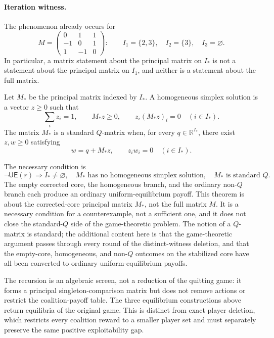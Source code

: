 \documentclass[11pt]{article}
\newcommand{\R}{\mathbb R}
\newcommand{\UE}{\mathsf{UE}}
\begin{document}
\paragraph{Iteration witness.}
The phenomenon already occurs for
\[
 M=\begin{pmatrix}
 0&1&1\\[-1mm]
 -1&0&1\\[-1mm]
 1&-1&0
 \end{pmatrix}:
 \qquad I_1=\{2,3\},\quad I_2=\{3\},\quad I_3=\varnothing.
\]
In particular, a matrix statement about the principal matrix on
$I_*$ is not a statement about the principal matrix on $I_1$, and neither is
a statement about the full matrix.

Let $M_*$ be the principal matrix indexed by $I_*$.  A homogeneous simplex
solution is a vector $z\ge0$ such that
\[
 \sum_i z_i=1,
 \qquad M_*z\ge0,
 \qquad z_i(M_*z)_i=0\quad(i\in I_*).
\]
The matrix $M_*$ is a standard $Q$-matrix when, for every
$q\in\R^{I_*}$, there exist $z,w\ge0$ satisfying
\[
 w=q+M_*z,
 \qquad z_iw_i=0\quad(i\in I_*).
\]

The necessary condition is
\begin{equation}
\label{eq:core-q-gate}
 \boxed{
 \neg\UE(r)\Longrightarrow
 I_*\ne\varnothing,\quad
 M_*\text{ has no homogeneous simplex solution},\quad
 M_*\text{ is standard }Q.}
\end{equation}
The empty corrected core, the homogeneous branch, and the ordinary non-$Q$
branch each produce an ordinary uniform-equilibrium payoff.  This theorem is
about the corrected-core principal matrix $M_*$, not the full matrix $M$.
It is a necessary condition for a counterexample, not a sufficient one, and
it does not close the standard-$Q$ side of the game-theoretic problem.  The
notion of a $Q$-matrix is standard; the additional content here is that the
game-theoretic argument passes through every round of the distinct-witness
deletion, and that the empty-core, homogeneous, and non-$Q$ outcomes on the
stabilized core have all been converted to ordinary uniform-equilibrium
payoffs.

The recursion is an algebraic screen, not a reduction of the quitting game:
it forms a principal singleton-comparison matrix but does not remove actions
or restrict the coalition-payoff table.  The three equilibrium constructions above
return equilibria of the original game.  This is distinct from exact player
deletion, which restricts every coalition reward to a smaller player set and
must separately preserve the same positive exploitability gap.
\end{document}

